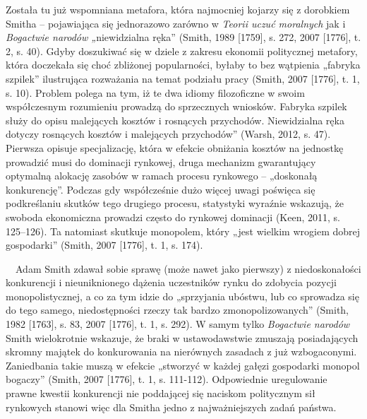 \documentclass[a4paper]{article}
\begin{document}
Została tu już wspomniana metafora, która najmocniej kojarzy się z dorobkiem Smitha – pojawiająca się jednorazowo
zarówno w \textit{Teorii uczuć moralnych} jak i \textit{Bogactwie narodów „}niewidzialna ręka”
\label{ref:RND3arQWlZpRs}(Smith, 1989 [1759], s. 272, 2007 [1776], t. 2, s. 40). Gdyby doszukiwać się w dziele z
zakresu ekonomii politycznej metafory, która doczekała się choć zbliżonej popularności, byłaby to bez wątpienia
„fabryka szpilek” ilustrująca rozważania na temat podziału pracy \label{ref:RNDhErhk4QekH}(Smith, 2007 [1776], t. 1, s.
10). Problem polega na tym, iż te dwa idiomy filozoficzne w swoim współczesnym rozumieniu prowadzą do sprzecznych
wniosków. Fabryka szpilek służy do opisu malejących kosztów i rosnących przychodów. Niewidzialna ręka dotyczy rosnących
kosztów i malejących przychodów” \label{ref:RNDXgp9RVVtIw}(Warsh, 2012, s. 47). Pierwsza opisuje specjalizację, która w
efekcie obniżania kosztów na jednostkę prowadzić musi do dominacji rynkowej, druga mechanizm gwarantujący optymalną
alokację zasobów w ramach procesu rynkowego – „doskonałą konkurencję”. Podczas gdy współcześnie dużo więcej uwagi
poświęca się podkreślaniu skutków tego drugiego procesu, statystyki wyraźnie wskazują, że swoboda ekonomiczna prowadzi
często do rynkowej dominacji \label{ref:RNDf5LDvzVDLR}(Keen, 2011, s. 125–126). Ta natomiast skutkuje monopolem, który
„jest wielkim wrogiem dobrej gospodarki” \label{ref:RNDQi3f6tgrVU}(Smith, 2007 [1776], t. 1, s. 174). 

 \ \ Adam Smith zdawał sobie sprawę (może nawet jako pierwszy) z niedoskonałości konkurencji i nieuniknionego dążenia
uczestników rynku do zdobycia pozycji monopolistycznej, a co za tym idzie do „sprzyjania ubóstwu, lub co sprowadza się
do tego samego, niedostępności rzeczy tak bardzo zmonopolizowanych” \label{ref:RNDSBDgty6ieq}(Smith, 1982 [1763], s.
83, 2007 [1776], t. 1, s. 292). W samym tylko \textit{Bogactwie narodów} Smith wielokrotnie wskazuje, że braki w
ustawodawstwie zmuszają posiadających skromny majątek do konkurowania na nierównych zasadach z już wzbogaconymi.
Zaniedbania takie muszą w efekcie „stworzyć w każdej gałęzi gospodarki monopol bogaczy”
\label{ref:RNDnMNpl04czP}(Smith, 2007 [1776], t. 1, s. 111-112). Odpowiednie uregulowanie prawne kwestii konkurencji
nie poddającej się naciskom politycznym sił rynkowych stanowi więc dla Smitha jedno z najważniejszych zadań państwa.
\end{document}
